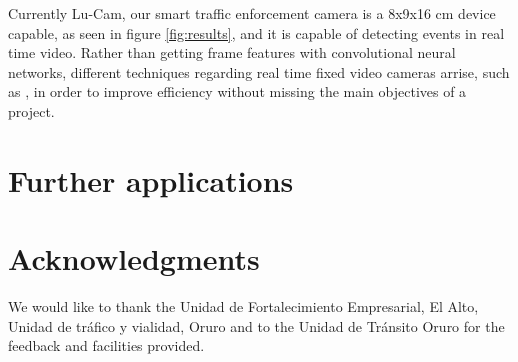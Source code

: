 \documentclass[fleqn,12pt]{SelfArx} %
\begin{document}
Currently Lu-Cam, our smart traffic enforcement camera is a 8x9x16 cm device capable, as seen in figure \ref{fig:results}, and it is capable of detecting events in real time video. Rather than getting frame features with convolutional neural networks, different techniques regarding real time fixed video cameras arrise, such as \cite{Cavigelli:2017:CCI:3131885.3131906}, in order to improve efficiency without missing the main objectives of a project.



\section{Further applications}

\lipsum[15-23] %

\section*{Acknowledgments} %


We would like to thank the Unidad de Fortalecimiento Empresarial, El Alto, Unidad de tráfico y vialidad, Oruro and to the Unidad de Tránsito Oruro for the feedback and facilities provided.




\end{document}
